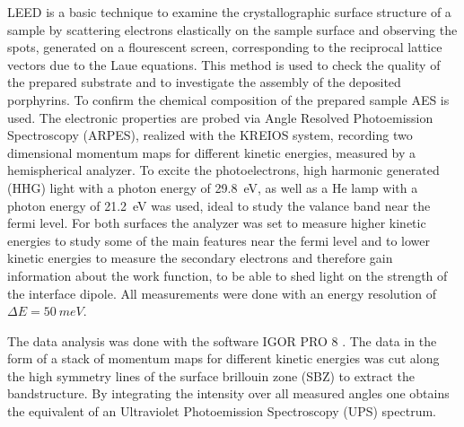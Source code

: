 LEED is a basic technique to examine the crystallographic surface structure of a sample by scattering electrons elastically on the sample surface and observing the spots, generated on a flourescent screen, corresponding to the reciprocal lattice vectors due to the Laue equations.
This method is used to check the quality of the prepared substrate and to investigate the assembly of the deposited porphyrins.
To confirm the chemical composition of the prepared sample AES is used.
The electronic properties are probed via Angle Resolved Photoemission Spectroscopy (ARPES), realized with the KREIOS system, recording two dimensional momentum maps for different kinetic energies, measured by a hemispherical analyzer.
To excite the photoelectrons, high harmonic generated (HHG) light with a photon energy of \qty{29,8}{eV}, as well as a He lamp with a photon energy of \qty{21,2}{eV} was used, ideal to study the valance band near the fermi level.
For both surfaces the analyzer was set to measure higher kinetic energies to study some of the main features near the fermi level and to lower kinetic energies to measure the secondary electrons and therefore gain information about the work function, to be able to shed light on the strength of the interface dipole.
All measurements were done with an energy resolution of $\Delta E = \qty{50}{meV}$.

The data analysis was done with the software IGOR PRO 8 \cite*{igor}.
The data in the form of a stack of momentum maps for different kinetic energies was cut along the high symmetry lines of the surface brillouin zone (SBZ) to extract the bandstructure.
By integrating the intensity over all measured angles one obtains the equivalent of an Ultraviolet Photoemission Spectroscopy (UPS) spectrum.

